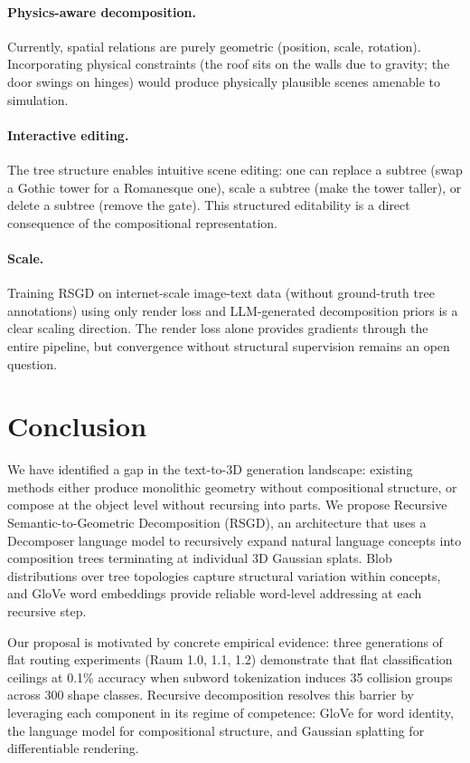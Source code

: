 \documentclass[11pt]{article}
\begin{document}
\paragraph{Physics-aware decomposition.} Currently, spatial relations are purely geometric (position, scale, rotation). Incorporating physical constraints (the roof sits on the walls due to gravity; the door swings on hinges) would produce physically plausible scenes amenable to simulation.

\paragraph{Interactive editing.} The tree structure enables intuitive scene editing: one can replace a subtree (swap a Gothic tower for a Romanesque one), scale a subtree (make the tower taller), or delete a subtree (remove the gate). This structured editability is a direct consequence of the compositional representation.

\paragraph{Scale.} Training RSGD on internet-scale image-text data (without ground-truth tree annotations) using only render loss and LLM-generated decomposition priors is a clear scaling direction. The render loss alone provides gradients through the entire pipeline, but convergence without structural supervision remains an open question.

\section{Conclusion}

We have identified a gap in the text-to-3D generation landscape: existing methods either produce monolithic geometry without compositional structure, or compose at the object level without recursing into parts. We propose Recursive Semantic-to-Geometric Decomposition (RSGD), an architecture that uses a Decomposer language model to recursively expand natural language concepts into composition trees terminating at individual 3D Gaussian splats. Blob distributions over tree topologies capture structural variation within concepts, and GloVe word embeddings provide reliable word-level addressing at each recursive step.

Our proposal is motivated by concrete empirical evidence: three generations of flat routing experiments (Raum 1.0, 1.1, 1.2) demonstrate that flat classification ceilings at 0.1\% accuracy when subword tokenization induces 35 collision groups across 300 shape classes. Recursive decomposition resolves this barrier by leveraging each component in its regime of competence: GloVe for word identity, the language model for compositional structure, and Gaussian splatting for differentiable rendering.
\end{document}
